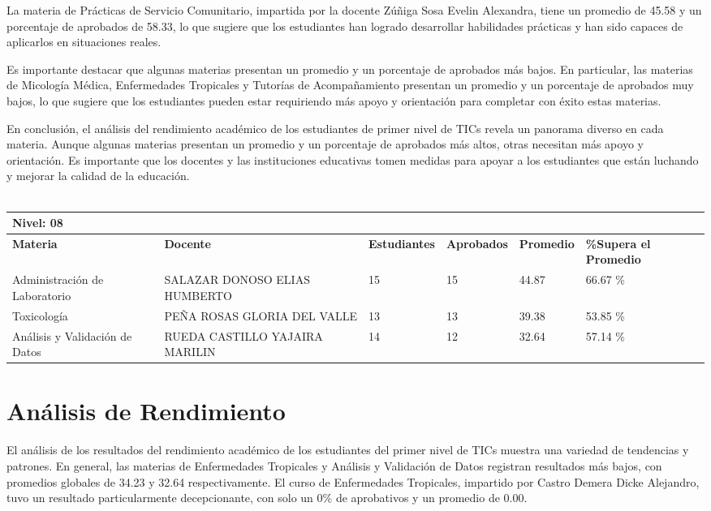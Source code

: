 La materia de Prácticas de Servicio Comunitario, impartida por la docente Zúñiga Sosa Evelin Alexandra, tiene un promedio de 45.58 y un porcentaje de aprobados de 58.33, lo que sugiere que los estudiantes han logrado desarrollar habilidades prácticas y han sido capaces de aplicarlos en situaciones reales.

Es importante destacar que algunas materias presentan un promedio y un porcentaje de aprobados más bajos. En particular, las materias de Micología Médica, Enfermedades Tropicales y Tutorías de Acompañamiento presentan un promedio y un porcentaje de aprobados muy bajos, lo que sugiere que los estudiantes pueden estar requiriendo más apoyo y orientación para completar con éxito estas materias.

En conclusión, el análisis del rendimiento académico de los estudiantes de primer nivel de TICs revela un panorama diverso en cada materia. Aunque algunas materias presentan un promedio y un porcentaje de aprobados más altos, otras necesitan más apoyo y orientación. Es importante que los docentes y las instituciones educativas tomen medidas para apoyar a los estudiantes que están luchando y mejorar la calidad de la educación.\\
\vspace{1cm}\\\small
\begin{tabularx}{\textwidth}{|p{2.5cm}|p{2.5cm}|X|X|X|X|}
\hline
\multicolumn{6}{|X|}{\textbf{Nivel: 08 }}\\\hline\textbf{Materia} & \textbf{Docente} & \textbf{Estudiantes} & \textbf{Aprobados} & \textbf{Promedio} & \textbf{\%Supera el Promedio} \\ \hline
Administración de Laboratorio & SALAZAR DONOSO ELIAS HUMBERTO & 15 & 15 & 44.87 & 66.67 \%\\ \hline
Toxicología & PEÑA ROSAS GLORIA DEL VALLE & 13 & 13 & 39.38 & 53.85 \%\\ \hline
Análisis y Validación de Datos & RUEDA CASTILLO YAJAIRA MARILIN & 14 & 12 & 32.64 & 57.14 \%\\ \hline
\end{tabularx}

\vspace{1cm}
\section{Análisis de Rendimiento}
El análisis de los resultados del rendimiento académico de los estudiantes del primer nivel de TICs muestra una variedad de tendencias y patrones. En general, las materias de Enfermedades Tropicales y Análisis y Validación de Datos registran resultados más bajos, con promedios globales de 34.23 y 32.64 respectivamente. El curso de Enfermedades Tropicales, impartido por Castro Demera Dicke Alejandro, tuvo un resultado particularmente decepcionante, con solo un 0\% de aprobativos y un promedio de 0.00.

